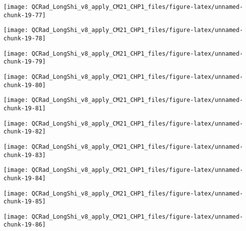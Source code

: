 \documentclass[
  10pt,
  a4paper,oneside]{article}
\begin{document}
\begin{center}\texttt{[image: QCRad\_LongShi\_v8\_apply\_CM21\_CHP1\_files/figure-latex/unnamed-chunk-19-77]} \end{center}

\begin{center}\texttt{[image: QCRad\_LongShi\_v8\_apply\_CM21\_CHP1\_files/figure-latex/unnamed-chunk-19-78]} \end{center}

\begin{center}\texttt{[image: QCRad\_LongShi\_v8\_apply\_CM21\_CHP1\_files/figure-latex/unnamed-chunk-19-79]} \end{center}

\begin{center}\texttt{[image: QCRad\_LongShi\_v8\_apply\_CM21\_CHP1\_files/figure-latex/unnamed-chunk-19-80]} \end{center}

\begin{center}\texttt{[image: QCRad\_LongShi\_v8\_apply\_CM21\_CHP1\_files/figure-latex/unnamed-chunk-19-81]} \end{center}

\begin{center}\texttt{[image: QCRad\_LongShi\_v8\_apply\_CM21\_CHP1\_files/figure-latex/unnamed-chunk-19-82]} \end{center}

\begin{center}\texttt{[image: QCRad\_LongShi\_v8\_apply\_CM21\_CHP1\_files/figure-latex/unnamed-chunk-19-83]} \end{center}

\begin{center}\texttt{[image: QCRad\_LongShi\_v8\_apply\_CM21\_CHP1\_files/figure-latex/unnamed-chunk-19-84]} \end{center}

\begin{center}\texttt{[image: QCRad\_LongShi\_v8\_apply\_CM21\_CHP1\_files/figure-latex/unnamed-chunk-19-85]} \end{center}

\begin{center}\texttt{[image: QCRad\_LongShi\_v8\_apply\_CM21\_CHP1\_files/figure-latex/unnamed-chunk-19-86]} \end{center}
\end{document}
